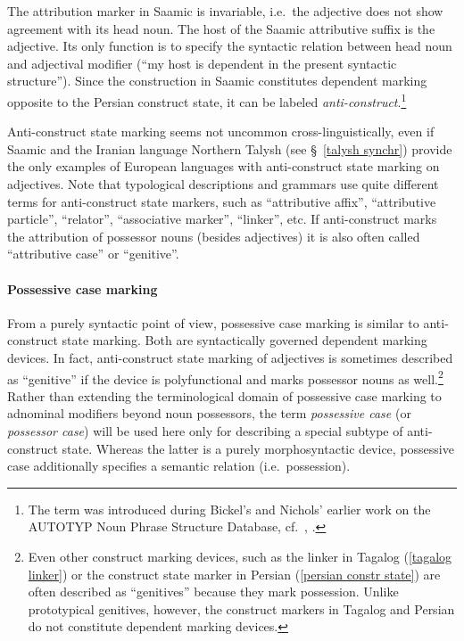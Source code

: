 The attribution marker in Saamic is invariable, i.e.~the adjective does not show agreement with its head noun. The host of the Saamic attributive suffix is the adjective. Its only function is to specify the syntactic relation between head noun and adjectival modifier (“my host is dependent in the present syntactic structure”). Since the construction in Saamic constitutes dependent marking opposite to the Persian construct state, it can be labeled \emph{anti\hyp{}construct}.\footnote{The term was introduced during Bickel's and Nichols' earlier work on the AUTOTYP Noun Phrase Structure Database, cf.~\citet[2, elsewhere]{bickel-etal2002}, \citet{AUTOTYP-NP}.} 

Anti\hyp{}construct state marking seems not uncommon cross-linguistically, even if Saamic and the Iranian language Northern Talysh (see \S~\ref{talysh synchr}) provide the only examples of European languages with anti\hyp{}construct state marking on adjectives. Note that typological descriptions and grammars use quite different terms for anti\hyp{}construct state markers, such as “attributive affix”, “attributive particle”, “relator”, “associative marker”, “linker”, etc. If anti\hyp{}construct marks the attribution of possessor nouns (besides adjectives) it is also often called “attributive case” or “genitive”.

\paragraph{Possessive case marking} 
From a purely syntactic point of view, possessive case marking is similar to anti\hyp{}construct state marking. Both are syntactically governed dependent marking devices. In fact, anti\hyp{}construct state marking of adjectives is sometimes described as “genitive” if the device is polyfunctional and marks possessor nouns as well.\footnote{Even other construct marking devices, such as the linker in Tagalog (\ref{tagalog linker}) or the construct state marker in Persian (\ref{persian constr state}) are often described as “genitives” because they mark possession. Unlike prototypical genitives, however, the construct markers in Tagalog and Persian do not constitute dependent marking devices.} Rather than extending the terminological domain of possessive case marking to adnominal modifiers beyond noun possessors, the term \emph{possessive case} (or \emph{possessor case}) will be used here only for describing a special subtype of anti\hyp{}construct state. Whereas the latter is a purely morphosyntactic device, possessive case additionally specifies a semantic relation (i.e.~possession).

